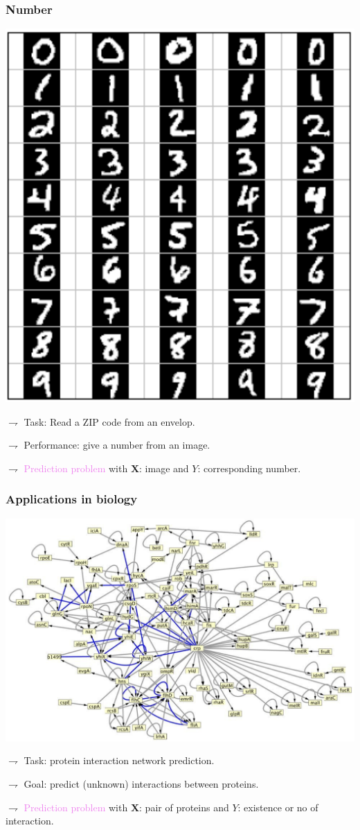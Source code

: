 \documentclass[9pt]{beamer}
\newcommand{\vecX}{\textbf{X}}
\begin{document}
\begin{frame}
	\frametitle{Number}
	\centerline{\includegraphics[width=.4\textwidth]{mnist}}
	\vspace*{.3cm}

$\rightharpoondown$   \alert{Task}: Read a ZIP code from an envelop.

$\rightharpoondown$  \alert{Performance}:  give a number from an image.

$\rightharpoondown$  \textcolor{violet}{Prediction problem} with $\vecX$:  image and $Y$: corresponding number.

\end{frame}

\begin{frame}
	\frametitle{Applications in biology}
	\centerline{\includegraphics[width=.6\textwidth]{bio}}

$\rightharpoondown$   \alert{Task}: protein interaction network prediction.

$\rightharpoondown$  \alert{Goal}: predict (unknown) interactions between proteins.

$\rightharpoondown$  \textcolor{violet}{Prediction problem} with $\vecX$: pair of proteins and $Y$: existence or no of interaction.


\end{frame}
\end{document}
